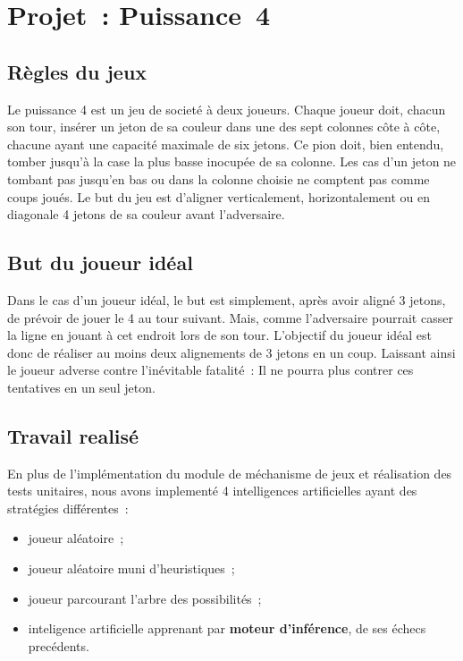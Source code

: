 \chapter{Projet~: Puissance~4}

\section{Règles du jeux}

Le puissance 4 est un jeu de societé à deux joueurs. Chaque joueur doit,
chacun son tour, insérer un jeton de sa couleur dans une des sept
colonnes côte à côte, chacune ayant une capacité maximale de
six jetons. Ce pion doit, bien entendu, tomber jusqu'à la case la plus basse inocupée de sa colonne. Les cas d'un jeton ne tombant pas jusqu'en bas ou dans la colonne choisie ne comptent pas comme coups joués. Le but du jeu est d'aligner verticalement, horizontalement 
ou en diagonale 4 jetons de sa couleur avant l'adversaire.


\section{But du joueur idéal}

Dans le cas d'un joueur idéal, le but est simplement, après avoir aligné 3 jetons,
de prévoir de jouer le 4 au tour suivant. Mais, comme l'adversaire pourrait casser la ligne en jouant à cet endroit
lors de son tour. L'objectif du joueur idéal est donc de réaliser
au moins deux alignements de 3 jetons en un coup. Laissant ainsi le joueur adverse
contre l'inévitable fatalité~: Il ne pourra plus contrer ces tentatives en un seul jeton.


\section{Travail realisé}

En plus de l'implémentation du module de méchanisme de jeux et réalisation des
tests unitaires, nous avons implementé 4 intelligences artificielles ayant des stratégies différentes~:

\begin{itemize}

    \item joueur aléatoire~;
    \item joueur aléatoire muni d'heuristiques~;
    \item joueur parcourant l'arbre des possibilités~;
    \item inteligence artificielle apprenant par \textbf{moteur d'inférence}, de ses
    échecs precédents.

\end{itemize}

